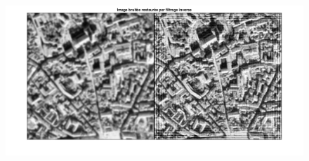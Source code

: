 \begin{figure}[H]
    \centering
    \includegraphics[width=1\linewidth]{Doc/Graphics/Part1/Q21b.png}
\end{figure}

